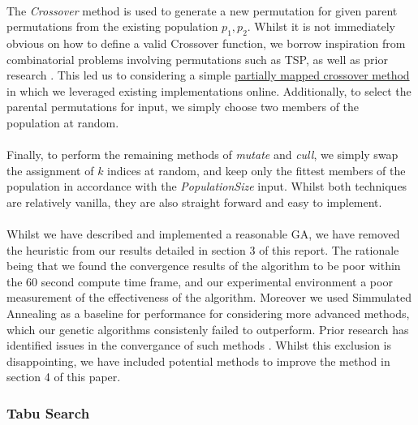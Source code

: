 \documentclass[a4paper,10pt]{article}
\begin{document}
\\
The \textit{Crossover} method is used to generate a new permutation for given parent permutations from the existing population $p_1, p_2$. Whilst it is not immediately obvious on how to define a valid Crossover function, we borrow inspiration from combinatorial problems involving permutations such as TSP, as well as prior research \cite{1994Improved, GAPopulation}. This led us to considering a simple \href{https://en.wikipedia.org/wiki/Crossover_(genetic_algorithm)}{partially mapped crossover method} in which we leveraged existing implementations online. Additionally, to select the parental permutations for input, we simply choose two members of the population at random. \\
\\
Finally, to perform the remaining methods of \textit{mutate} and \textit{cull}, we simply swap the assignment of $k$ indices at random, and keep only the fittest members of the population in accordance with the \textit{PopulationSize} input. Whilst both techniques are relatively vanilla, they are also straight forward and easy to implement. \\
\\
Whilst we have described and implemented a reasonable GA, we have removed the heuristic from our results detailed in section 3 of this report. The rationale being that we found the convergence results of the algorithm to be poor within the 60 second compute time frame, and our experimental environment a poor measurement of the effectiveness of the algorithm. Moreover we used Simmulated Annealing as a baseline for performance for considering more advanced methods, which our genetic algorithms consistenly failed to outperform. Prior research has identified issues in the convergance of such methods \cite{HE199923}. 
Whilst this exclusion is disappointing, we have included potential methods to improve the method in section 4 of this paper.  


\subsubsection*{Tabu Search}
\end{document}
